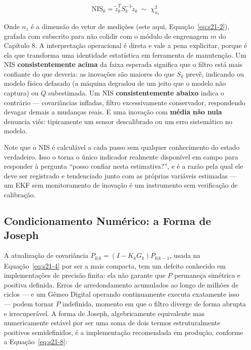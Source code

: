 \documentclass[12pt,a4paper]{article}
\numberwithin{equation}{section}
\numberwithin{table}{section}
\numberwithin{figure}{section}
\begin{document}
	\begin{equation}\label{eq:s21-7}
	\text{NIS}_k = \tilde{z}_k^T S_k^{-1} \tilde{z}_k \;\sim\; \chi^2_{n_z}
\end{equation}

	Onde $n_z$ é a dimensão do vetor de medições (sete aqui, Equação~\eqref{eq:s21-2}), grafada com subscrito para não colidir com o módulo de engrenagem $m$ do Capítulo 8. A interpretação operacional é direta e vale a pena explicitar, porque é ela que transforma uma identidade estatística em ferramenta de manutenção. Um NIS \textbf{consistentemente acima} da faixa esperada significa que o filtro está mais confiante do que deveria: as inovações são maiores do que $S_k$ prevê, indicando ou modelo físico defasado (a máquina degradou de um jeito que o modelo não captura) ou $Q$ subestimada. Um NIS \textbf{consistentemente abaixo} indica o contrário — covariâncias infladas, filtro excessivamente conservador, respondendo devagar demais a mudanças reais. E uma inovação com \textbf{média não nula} denuncia viés: tipicamente um sensor descalibrado ou um erro sistemático no modelo.

	Note que o NIS é calculável a cada passo sem qualquer conhecimento do estado verdadeiro. Isso o torna o único indicador realmente disponível em campo para responder à pergunta ``posso confiar nesta estimativa?'', e é a razão pela qual ele deve ser registrado e tendenciado junto com as próprias variáveis estimadas — um EKF sem monitoramento de inovação é um instrumento sem verificação de calibração.

	\subsection{Condicionamento Numérico: a Forma de Joseph}

	A atualização de covariância $P_{k|k} = (I - K_k G_k) P_{k|k-1}$, usada na Equação~\eqref{eq:s21-4} por ser a mais compacta, tem um defeito conhecido em implementações de precisão finita: ela não garante que $P$ permaneça simétrica e positiva definida. Erros de arredondamento acumulados ao longo de milhões de ciclos — e um Gêmeo Digital operando continuamente executa exatamente isso — podem tornar $P$ indefinida, momento em que o filtro diverge de forma abrupta e irrecuperável. A forma de Joseph, algebricamente equivalente mas numericamente estável por ser uma soma de dois termos estruturalmente positivos semidefinidos, é a implementação recomendada em produção, conforme a Equação~\eqref{eq:s21-8}:
\end{document}

